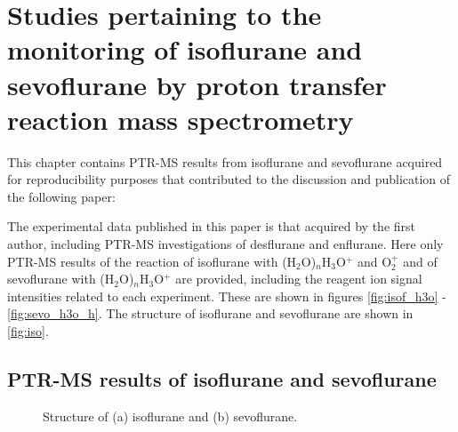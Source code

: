 

\chapter{Studies pertaining to the monitoring of isoflurane and sevoflurane by proton transfer reaction mass spectrometry}\label{chapter:iso}


This chapter contains PTR-MS results from isoflurane and sevoflurane acquired for reproducibility purposes that contributed to the discussion and publication of the following paper:



The experimental data published in this paper is that acquired by the first author, including PTR-MS investigations of desflurane and enflurane.
%
Here only PTR-MS results of the reaction 
of isoflurane with (H$_2$O)$_n$H$_3$O$^+$ and O$_2^+$ 
and of sevoflurane with (H$_2$O)$_n$H$_3$O$^+$ 
are provided, including the reagent ion signal intensities related to each experiment.
%
These are shown in figures \ref{fig:isof_h3o} - \ref{fig:sevo_h3o_h}.
%
%
%
%
The structure of isoflurane and sevoflurane are shown in \autoref{fig:iso}.



\section{PTR-MS results of isoflurane and sevoflurane}


\begin{figure}
  \caption{Structure of (a) isoflurane and (b) sevoflurane.}
  \label{fig:iso}
\end{figure}




